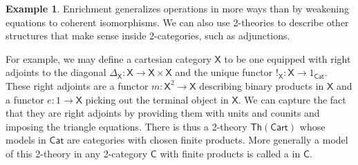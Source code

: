 \documentclass{amsart}
\newcommand{\define}[1]{{\bf \boldmath{#1}}}
\theoremstyle{definition}
\newtheorem{example}[theorem]{Example}
\newcommand{\Th}{\mathsf{Th}}
\newcommand{\Cat}{\mathsf{Cat}}
\newcommand{\C}{\mathsf{C}}
\newcommand{\X}{\mathsf{X}}
\newcommand{\maps}{\colon}
\begin{document}
\begin{example}
\label{ex:2}
 Enrichment generalizes operations in more ways than by weakening equations to coherent isomorphisms.  We can also use 2-theories to describe other structures that make sense inside 2-categories, such as adjunctions. 
  
 For example, we may define a cartesian category $\X$ to be one equipped with right adjoints to the diagonal $\Delta_\X\maps \X \to \X \times \X$ and the unique functor $!_\X \maps \X \to 1_\Cat$.    These right adjoints are a functor $m \maps \X^2 \to \X$ describing binary products in $\X$ and a functor $e \maps 1 \to \X$ picking out the terminal object in $\X$.   We can capture the fact that they are right adjoints by providing them with units and counits and imposing the triangle equations.   There is thus a 2-theory $\Th(\mathsf{Cart})$ whose models in $\Cat$ are categories with chosen finite products.  More generally a model of this 2-theory in any 2-category $\C$ with finite products is called a \define{cartesian object} in $\C$.
 

\end{example}
\end{document}
